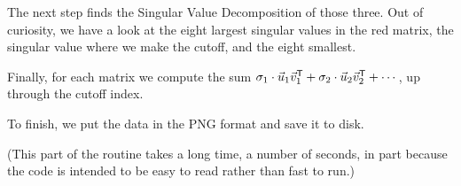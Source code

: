 The next step finds the Singular Value Decomposition of those three.
Out of curiosity, we have a look at the eight largest singular
values in the red matrix, the singular value where we make the cutoff,
and the eight smallest.


Finally, for each matrix we compute the sum
$\sigma_1\cdot\vec{u}_1{{\vec{v}}^{\mathsf{T}}}_1+\sigma_2\cdot\vec{u}_2{{\vec{v}}^{\mathsf{T}}}_2
   +\cdots\,$,
up through the cutoff index.


To finish, we put the data in the PNG format and save it to 
disk.

(This part of the routine takes a long time, a number of seconds, in part because
the code is intended to be easy to read rather than fast to run.)

\endinput


